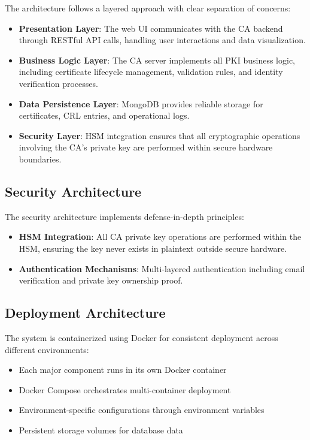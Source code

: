 The architecture follows a layered approach with clear separation of concerns:

\begin{itemize}
    \item \textbf{Presentation Layer}: The web UI communicates with the CA backend through RESTful API calls, handling user interactions and data visualization.
    
    \item \textbf{Business Logic Layer}: The CA server implements all PKI business logic, including certificate lifecycle management, validation rules, and identity verification processes.
    
    \item \textbf{Data Persistence Layer}: MongoDB provides reliable storage for certificates, CRL entries, and operational logs.
    
    \item \textbf{Security Layer}: HSM integration ensures that all cryptographic operations involving the CA's private key are performed within secure hardware boundaries.
\end{itemize}

\subsection{Security Architecture}

The security architecture implements defense-in-depth principles:

\begin{itemize}
    \item \textbf{HSM Integration}: All CA private key operations are performed within the HSM, ensuring the key never exists in plaintext outside secure hardware.
    
    \item \textbf{Authentication Mechanisms}: Multi-layered authentication including email verification and private key ownership proof.
    
\end{itemize}

\subsection{Deployment Architecture}

The system is containerized using Docker for consistent deployment across different environments:

\begin{itemize}
    \item Each major component runs in its own Docker container
    \item Docker Compose orchestrates multi-container deployment
    \item Environment-specific configurations through environment variables
    \item Persistent storage volumes for database data
\end{itemize}

